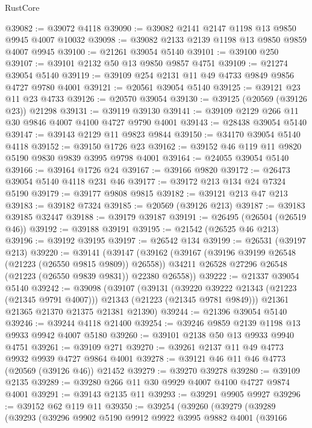 \begin{lexlean}{RustCore}
\begin{coremodule}
@39082 := @39072 @4118
@39090 := @39082 @2141 @2147 @1198 @13 @9850 @9945 @4007 @10032
@39098 := @39082 @2133 @2139 @1198 @13 @9850 @9859 @4007 @9945
@39100 := @21261 @39054 @5140
@39101 := @39100 @250
@39107 := @39101 @2132 @50 @13 @9850 @9857 @4751
@39109 := @21274 @39054 @5140
@39119 := @39109 @254 @2131 @11 @49 @4733 @9849 @9856 @4727 @9780 @4001
@39121 := @20561 @39054 @5140
@39125 := @39121 @23 @11 @23 @4733
@39126 := @20570 @39054
@39130 := @39125 (@20569 (@39126 @23)) @21298
@39131 := @39119 @39130
@39141 := @39109 @2129 @266 @11 @30 @9846 @4007 @4100 @4727 @9790 @4001
@39143 := @28438 @39054 @5140
@39147 := @39143 @2129 @11 @9823 @9844
@39150 := @34170 @39054 @5140 @4118
@39152 := @39150 @1726 @23
@39162 := @39152 @46 @119 @11 @9820 @5190 @9830 @9839 @3995 @9798 @4001
@39164 := @24055 @39054 @5140
@39166 := @39164 @1726 @24
@39167 := @39166 @9820
@39172 := @26473 @39054 @5140 @4118 @231 @46
@39177 := @39172 @213 @134 @24 @7324 @5190
@39179 := @39177 @9808 @9815
@39182 := @39121 @213 @47 @213
@39183 := @39182 @7324
@39185 := @20569 (@39126 @213)
@39187 := @39183 @39185 @32447
@39188 := @39179 @39187
@39191 := @26495 (@26504 (@26519 @46))
@39192 := @39188 @39191
@39195 := @21542 (@26525 @46 @213)
@39196 := @39192 @39195
@39197 := @26542 @134
@39199 := @26531 (@39197 @213)
@39220 := @39141
    (@39147
      (@39162
        (@39167 (@39196 @39199 @26548 (@21223 (@26550 @9815 @9809)) @26558))
        @34211
        @26528
        @27296
        @26548
        (@21223 (@26550 @9839 @9831))
        @22380
        @26558))
@39222 := @21337 @39054 @5140
@39242 := @39098
    (@39107
      (@39131
        (@39220 @39222 @21343 (@21223 (@21345 @9791 @4007)))
        @21343
        (@21223 (@21345 @9781 @9849)))
      @21361
      @21365
      @21370
      @21375
      @21381
      @21390)
@39244 := @21396 @39054 @5140
@39246 := @39244 @4118 @21400
@39254 := @39246 @9859 @2139 @1198 @13 @9933 @9942 @4007 @5180
@39260 := @39101 @2138 @50 @13 @9933 @9940 @4751
@39261 := @39109 @271
@39270 := @39261 @2137 @11 @49 @4773 @9932 @9939 @4727 @9864 @4001
@39278 := @39121 @46 @11 @46 @4773 (@20569 (@39126 @46)) @21452
@39279 := @39270 @39278
@39280 := @39109 @2135
@39289 := @39280 @266 @11 @30 @9929 @4007 @4100 @4727 @9874 @4001
@39291 := @39143 @2135 @11
@39293 := @39291 @9905 @9927
@39296 := @39152 @62 @119 @11
@39350 := @39254
    (@39260
      (@39279
        (@39289
          (@39293
            (@39296
              @9902
              @5190
              @9912
              @9922
              @3995
              @9882
              @4001
              (@39166

\end{coremodule}
\end{lexlean}
